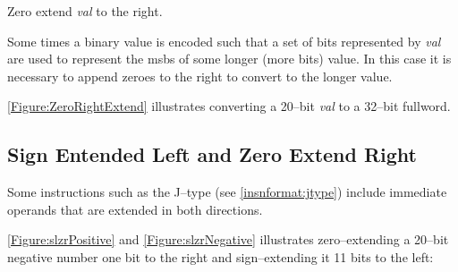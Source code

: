 Zero extend {\em val} to the right.

Some times a binary value is encoded such that a set of bits represented
by {\em val} are used to represent the \acrshort{msb}s of some longer (more bits) 
value.  
In this case it is necessary to append zeroes to the right to convert \verb@val@ to 
the longer value.

\autoref{Figure:ZeroRightExtend} illustrates converting a 20--bit {\em val} to
a 32--bit fullword.

\begin{figure}[ht]
\centering
{}
\label{Figure:ZeroRightExtend}
\end{figure}



\subsection{Sign Entended Left and Zero Extend Right}
\label{extension:slzr}

Some instructions such as the J--type (see \autoref{insnformat:jtype}) include
immediate operands that are extended in both directions.

\autoref{Figure:slzrPositive} and \autoref{Figure:slzrNegative}
illustrates zero--extending a 20--bit negative number one bit to the right 
and sign--extending it 11 bits to the left:

\begin{figure}[ht]
\centering
{}
\label{Figure:slzrPositive}
\end{figure}

\begin{figure}[ht]
\centering
{}
\label{Figure:slzrNegative}
\end{figure}


